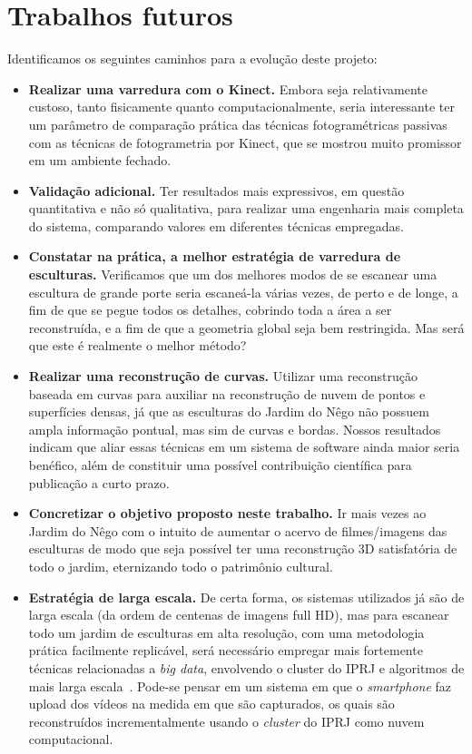 \section{Trabalhos futuros} Identificamos os seguintes caminhos para a evolução deste projeto:
\begin{itemize}
\item \textbf{Realizar uma varredura com o Kinect.} Embora seja relativamente
  custoso, tanto fisicamente quanto computacionalmente, seria interessante ter
  um parâmetro de comparação prática das técnicas fotogramétricas passivas com
as técnicas de fotogrametria por Kinect, que se mostrou muito promissor em um
ambiente fechado.  
\item \textbf{Validação adicional.} Ter resultados mais
  expressivos, em questão quantitativa e não só qualitativa, para realizar uma
  engenharia mais completa do sistema, comparando valores em diferentes técnicas
  empregadas.
\item \textbf{Constatar na prática, a melhor estratégia de varredura de
  esculturas.}
Verificamos que um dos melhores modos de se escanear uma escultura de grande
porte seria escaneá-la várias vezes, de perto e de longe, a fim de que se pegue todos os detalhes,
cobrindo toda a área a ser reconstruída, e a fim de que a geometria global seja
bem restringida. Mas será que este é realmente o melhor método?  
\item \textbf{Realizar uma reconstrução de curvas.} 
  Utilizar uma reconstrução baseada em curvas para auxiliar na reconstrução de
  nuvem de pontos e superfícies densas, já que as esculturas do Jardim do Nêgo
  não possuem ampla informação pontual, mas sim de curvas e bordas. Nossos
  resultados indicam que aliar essas técnicas em um sistema de software ainda
  maior seria benéfico, além de constituir uma possível contribuição científica
  para publicação a curto prazo.
\item \textbf{Concretizar o objetivo proposto neste trabalho.} Ir mais vezes
  ao Jardim do Nêgo com o intuito de aumentar o acervo de filmes/imagens das
  esculturas de modo que seja possível ter uma reconstrução 3D satisfatória de
  todo o jardim, eternizando todo o patrimônio cultural.  
\item \textbf{Estratégia de larga escala.} De certa forma, os sistemas
  utilizados já são de
  larga escala (da ordem de centenas de imagens full HD), mas para escanear todo um jardim de esculturas em alta
  resolução, com uma metodologia prática facilmente replicável,
  será necessário empregar mais fortemente técnicas relacionadas a \emph{big data}, envolvendo o cluster do IPRJ
  e algoritmos de mais larga escala~\cite{Argarwal:Snavely:etal:ICCV09}. Pode-se pensar em um sistema em que o
  \emph{smartphone} faz upload dos vídeos na medida em que são capturados, os
  quais são reconstruídos incrementalmente usando o \emph{cluster} do IPRJ como nuvem computacional.
\end{itemize}

